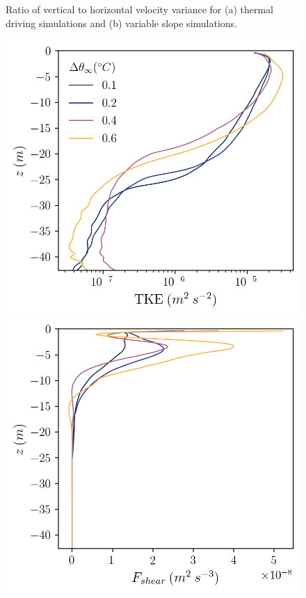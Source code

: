 \documentclass[draft,jgrga]{agutexSI2019}
\begin{document}
\begin{figure}[]
\begin{minipage}{0.5\textwidth}
    \end{minipage}
    \caption{Ratio of vertical to horizontal velocity variance for (a) thermal driving simulations and (b) variable slope simulations.}
    \label{fig:vel_var_ratio}
\end{figure}

\begin{figure}
    \centering
    \begin{minipage}{0.5\textwidth}
        \includegraphics[trim={0 0 0 0},clip, width=\textwidth]{Figures/eres_cmp_dT_43h_tav13h_z_profile.png}
    \end{minipage}%
    \begin{minipage}{0.5\textwidth}
        \includegraphics[trim={0 0 0 0},clip,width=\textwidth]{Figures/Fshear_cmp_dT_43h_tav13h_z_profile.png}    

\end{minipage}
\end{figure}
\end{document}
